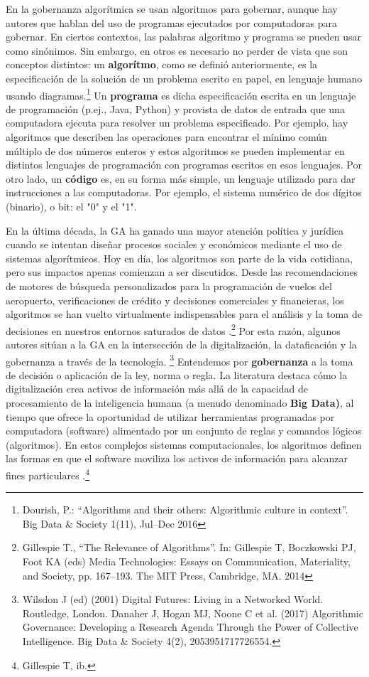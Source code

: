 \documentclass[12pt]{report} %
\begin{document}
En la gobernanza algorítmica se usan algoritmos para gobernar, aunque hay autores que hablan del uso de programas ejecutados por computadoras para gobernar. En ciertos contextos, las palabras algoritmo y programa se pueden usar como sinónimos. Sin embargo, en otros es necesario no perder de vista que son conceptos distintos: un \textbf{algorítmo}, como se definió anteriormente, es la especificación de la solución de un problema escrito en papel, en lenguaje humano usando diagramas.\footnote{Dourish, P.: “Algorithms and their others: Algorithmic culture in context”. Big Data
\& Society 1(11), Jul–Dec 2016
}  Un \textbf{programa} es dicha especificación escrita en un lenguaje de programación (p.ej., Java, Python) y provista de datos de entrada que una computadora ejecuta para resolver un problema especificado. Por ejemplo, hay algoritmos que describen las operaciones para encontrar el mínimo común múltiplo de dos números enteros y estos algoritmos se pueden implementar en distintos lenguajes de programación con programas escritos en esos lenguajes. Por otro lado, un \textbf{código} es, en su forma más simple, un lenguaje utilizado para dar instrucciones a las computadoras. Por ejemplo, el sistema numérico de dos dígitos (binario), o bit: el "0" y el "1".

En la última década, la GA ha ganado una mayor atención política y jurídica cuando se intentan diseñar procesos sociales y económicos mediante el uso de sistemas algorítmicos. Hoy en día, los algoritmos son parte de la vida cotidiana, pero sus impactos apenas comienzan a ser discutidos. Desde las recomendaciones de motores de búsqueda personalizados para la programación de vuelos del aeropuerto, verificaciones de crédito y decisiones comerciales y financieras, los algoritmos se han vuelto virtualmente indispensables para el análisis y la toma de decisiones en nuestros entornos saturados de datos .\footnote{Gillespie T., “The Relevance of Algorithms”. In: Gillespie T, Boczkowski PJ, Foot KA (eds) Media Technologies: Essays on Communication, Materiality, and Society, pp. 167–193. The MIT Press, Cambridge, MA. 2014} Por esta razón, algunos autores sitúan a la GA en la intersección de la digitalización, la dataficación y la gobernanza a través de la tecnología. \footnote{Wilsdon J (ed) (2001) Digital Futures: Living in a Networked World. Routledge, London. Danaher J, Hogan MJ, Noone C et al. (2017) Algorithmic Governance: Developing a Research Agenda Through the Power of Collective Intelligence. Big Data \& Society 4(2), 2053951717726554.} Entendemos por \textbf{gobernanza} a la toma de decisión o aplicación de la ley, norma o regla. La literatura destaca cómo la digitalización crea activos de información más allá de la capacidad de procesamiento de la inteligencia humana (a menudo denominado \textbf{Big Data)}, al tiempo que ofrece la oportunidad de utilizar herramientas programadas por computadora (software) alimentado por un conjunto de reglas y comandos lógicos (algoritmos). En estos complejos sistemas computacionales, los algoritmos definen las formas en que el software moviliza los activos de información para alcanzar fines particulares .\footnote{Gillespie T, ib.}
\end{document}
